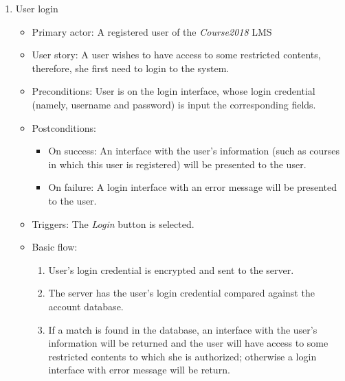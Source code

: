 \begin{enumerate}
\item User login
\begin{itemize}
\item Primary actor:
    A registered user of the \emph{Course2018} LMS
\item User story:
    A user wishes to have access to some restricted contents, therefore, she
    first need to login to the system.
\item Preconditions:
    User is on the login interface, whose login credential
    (namely, username and password) is input the corresponding fields.
\item Postconditions:
    \begin{itemize}
        \item On success: An interface with the user's information (such as courses
            in which this user is registered) will be presented to the user.
        \item On failure: A login interface with an error message will be
            presented to the user.
    \end{itemize}
\item Triggers: The \emph{Login} button is selected.
\item Basic flow:
    \begin{enumerate}
        \item User's login credential is encrypted and sent to the server.
        \item The server has the user's login credential compared against the
            account database.
        \item If a match is found in the database, an interface with the user's
            information will be returned and the user will have access to
            some restricted contents to which she is authorized; otherwise a
            login interface with error message will be return.
    \end{enumerate}
\end{itemize}


\end{enumerate}
